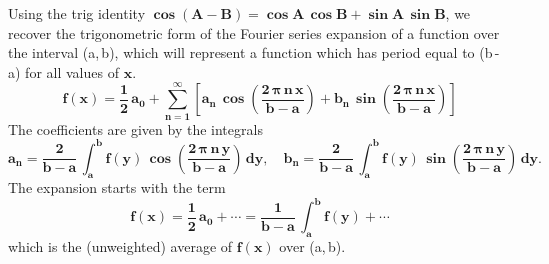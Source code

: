 \documentclass[12pt]{article}
\begin{document}
Using the trig identity $\mathbf{\boldsymbol{\cos}(A-B)= \boldsymbol{\cos} A \, \boldsymbol{\cos} B +
 \boldsymbol{\sin} A \, \boldsymbol{\sin} B}$, we recover the trigonometric form
 of the Fourier series expansion of a function over the interval (a,\,b), which will
 represent a function which has period equal to (b\,-\,a) for all values of $\mathbf{x}$.
\begin{equation} \label{Eq:ab1}
\mathbf{f(x) = \frac{1}{2} \, a_{0} + \sum_{n=1}^{\infty} \left[ 
   a_{n}\,\boldsymbol{\cos} \left( \frac{ 2\,\boldsymbol{\pi}\,n\,x}{b-a} \right) +
   b_{n} \,\boldsymbol{\sin} \left( \frac{ 2\,\boldsymbol{\pi}\,n\,x}{b-a} \right) \right] }
\end{equation}
The coefficients are given by the integrals
\begin{equation} \label{Eq:ab2}
\mathbf{ a_{n} = \frac{2}{b-a} \, \int_{a}^{b} f(y)\,
   \boldsymbol{\cos} \left( \frac{ 2\,\boldsymbol{\pi}\,n\,y}{b-a} \right) \, dy}, \quad
   \mathbf{ b_{n} = \frac{2}{b-a} \, \int_{a}^{b} f(y)\,
   \boldsymbol{\sin} \left( \frac{ 2\,\boldsymbol{\pi}\,n\,y}{b-a} \right) \, dy}. 
\end{equation}
The expansion starts with the term
\begin{equation}
\mathbf{f(x) = \frac{1}{2} \, a_{0} + \cdots  = \frac{1}{b-a} \, \int_{a}^{b} f(y) + \cdots }
\end{equation}
which is the (unweighted) average of $\mathbf{f(x)}$ over (a,\,b).\\
\end{document}
